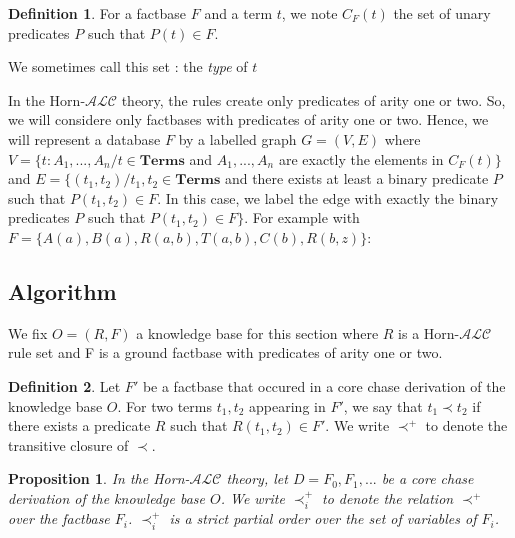 \documentclass{article}
\newtheorem{proposition}{Proposition}[section]
\theoremstyle{definition}
\newtheorem{definition}{Definition}[section]
\theoremstyle{remark}
\newcommand{\Terms}{\textbf{Terms}}
\begin{document}
\begin{definition}
For a factbase $F$ and a term $t$, we note \emph{$C_F(t)$} the set of unary predicates $P$ such that $P(t)\in F$.
\end{definition}

We sometimes call this set : the \emph{type} of $t$

In the Horn-$\mathcal{ALC}$ theory, the rules create only predicates of arity one or two. So, we will considere only factbases with predicates of arity one or two. Hence, we will represent a database $F$ by a labelled graph $G = (V,E)$ where $V = \{t:A_1,...,A_n /t \in \Terms$ and $A_1,...,A_n$ are exactly the elements in $C_F(t)\}$ and $E = \{(t_1,t_2) /t_1,t_2 \in \Terms$ and there exists at least a binary predicate $P$ such that $P(t_1,t_2) \in F$. In this case, we label the edge with exactly the binary predicates $P$ such that $P(t_1,t_2) \in F\}$. For example with $F = \{A(a), B(a),R(a,b),T(a,b),C(b),R(b,z)\}$: \\





\subsection{Algorithm}
We fix $O=(R,F)$ a knowledge base for this section where $R$ is a Horn-$\mathcal{ALC}$ rule set and F is a ground factbase with predicates of arity one or two.

\begin{definition}
Let $F'$ be a factbase that occured in a core chase derivation of the knowledge base $O$. For two terms $t_1,t_2$ appearing in $F'$, we say that $t_1 \prec t_2$ if there exists a predicate $R$ such that $R(t_1,t_2) \in F'$. We write $\prec^+$ to denote the transitive closure of $\prec$.
\end{definition}

\begin{proposition}
In the Horn-$\mathcal{ALC}$ theory, let $D = F_0,F_1,...$ be a core chase derivation of the knowledge base $O$. We write $\prec^+_i$ to denote the relation $\prec^+$ over the factbase $F_i$. $\prec^+_i$ is a strict partial order over the set of variables of $F_i$.
\end{proposition}
\end{document}

